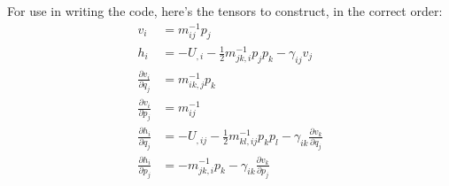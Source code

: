 \documentclass[aps,mph,amsmath,amssymb,author-year]{revtex4-1}
\newcommand{\pd}{\partial}
\begin{document}
For use in writing the code, here's the tensors to construct, in the correct order:
\begin{align}
	v_i&=m^{-1}_{ij}p_j\\
	h_i&=-U_{,i}-\frac{1}{2}m^{-1}_{jk,i}p_jp_k-\gamma_{ij}v_j\\
	\frac{\pd v_i}{\pd q_j}&=m^{-1}_{ik,j}p_k \\
	\frac{\pd v_i}{\pd p_j}&=m^{-1}_{ij} \\
	\frac{\pd h_i}{\pd q_j}&=-U_{,ij}-\frac{1}{2}m^{-1}_{kl,ij}p_kp_l-\gamma_{ik}\frac{\pd v_k}{\pd q_j}\\
	\frac{\pd h_i}{\pd p_j}&=-m_{jk,i}^{-1}p_k-\gamma_{ik}\frac{\pd v_k}{\pd p_j}
\end{align}
\end{document}

